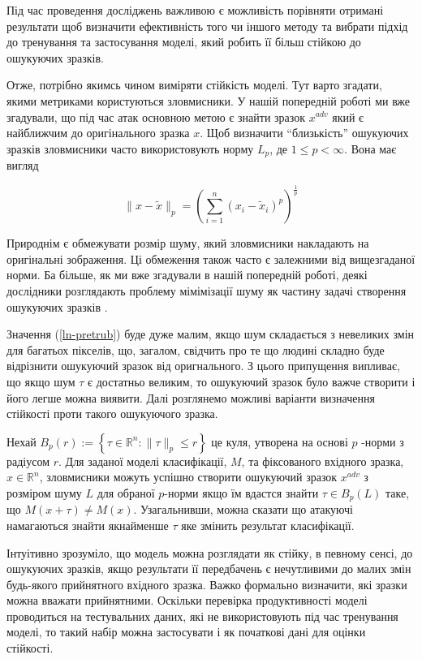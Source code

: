 \documentclass[14pt,a4paper]{extarticle}
\newcounter{e}
\numberwithin{equation}{section}
\numberwithin{figure}{section}
\begin{document}
 Під час проведення досліджень важливою є можливість порівняти отримані результати щоб визначити ефективність того чи іншого методу та вибрати підхід до тренування та застосування моделі, який робить її більш стійкою до ошукуючих зразків.
 
 Отже, потрібно якимсь чином виміряти стійкість моделі. Тут варто згадати, якими метриками користуються зловмисники. У нашій попередній роботі \cite{my-work} ми вже згадували, що під час атак основною метою є знайти зразок $x^{adv}$ який є найближчим до оригінального зразка $x$.
 Щоб визначити ``близькість'' ошукуючих зразків зловмисники часто використовують норму  $L_p$, де $1 \leq p<\infty$. Вона має вигляд
 
 \begin{equation}
 \label{ln-pretrub}
 \|x-\tilde{x}\|_{p}=\left(\sum_{i=1}^{n}\left(x_{i}-\tilde{x}_{i}\right)^{p}\right)^{\frac{1}{p}}
 \end{equation}
 
 Природнім є обмежувати розмір шуму, який зловмисники накладають на оригінальні зображення. Ці обмеження також часто є залежними від вищезгаданої норми. Ба більше, як ми вже згадували в нашій попередній роботі, деякі дослідники розглядають проблему мімімізації шуму як частину задачі створення ошукуючих зразків \cite{C-and-W}.
 
 Значення (\ref{ln-pretrub}) буде дуже малим, якщо шум складається з невеликих змін для багатьох пікселів, що, загалом, свідчить про те що людині складно буде відрізнити ошукуючий зразок від оригнального. З цього припущення випливає, що якщо шум $\tau$ є достатньо великим, то ошукуючий зразок було важче створити і його легше можна виявити.
 Далі розглянемо можливі варіанти визначення стійкості проти такого ошукуючого зразка.
 
 Нехай $B_{p}(r):=\left\{\tau \in \mathbb{R}^{n}:\|\tau\|_{p} \leq r\right\}$ це куля, утворена на основі $p$ -норми з радіусом $r$. Для заданої моделі класифікації, $M$, та фіксованого вхідного зразка, $x \in \mathbb{R}^{n}$, зловмисники можуть успішно створити ошукуючий зразок $x^{adv}$ з розміром шуму $L$ для обраної $p$-норми якщо їм вдастся знайти $\tau \in B_{p}(L)$ таке, що $M(x+\tau) \neq M(x)$. Узагальнивши, можна сказати що атакуючі намагаються знайти якнайменше $\tau$ яке змінить результат класифікації.
 
 Інтуітивно зрозуміло, що модель можна розглядати як стійку, в певному сенсі, до ошукуючих зразків, якщо результати її передбачень є нечутливими до малих змін будь-якого прийнятного вхідного зразка. Важко формально визначити, які зразки можна вважати прийнятними. Оскільки перевірка продуктивності моделі проводиться на тестувальних даних, які не використовують під час тренування моделі, то такий набір можна застосувати і як початкові дані для оцінки стійкості.
 
\end{document}
